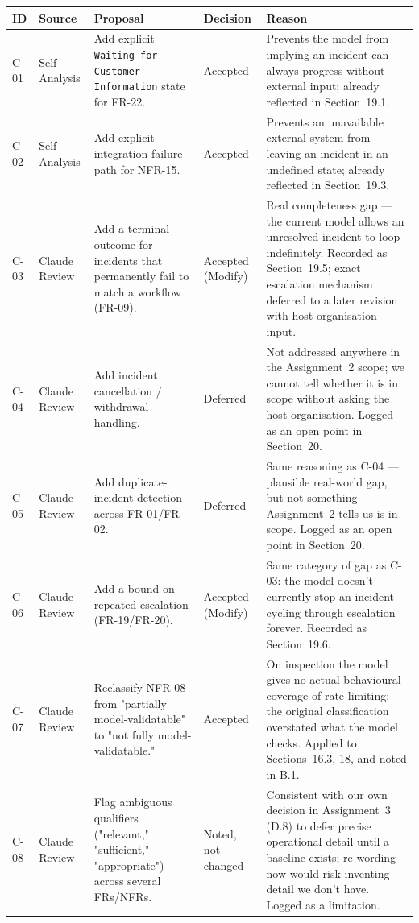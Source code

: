 \documentclass[11pt,a4paper]{article}
\begin{document}
\begin{center}
\small
\begin{tabularx}{\textwidth}{@{} l l X >{\centering\arraybackslash}p{1.9cm} X @{}}
\toprule
\textbf{ID} & \textbf{Source} & \textbf{Proposal} & \textbf{Decision} & \textbf{Reason} \\
\midrule
C-01 & Self Analysis & Add explicit \texttt{Waiting for Customer Information} state for FR-22. & Accepted & Prevents the model from implying an incident can always progress without external input; already reflected in Section~19.1. \\
C-02 & Self Analysis & Add explicit integration-failure path for NFR-15. & Accepted & Prevents an unavailable external system from leaving an incident in an undefined state; already reflected in Section~19.3. \\
C-03 & Claude Review & Add a terminal outcome for incidents that permanently fail to match a workflow (FR-09). & Accepted (Modify) & Real completeness gap — the current model allows an unresolved incident to loop indefinitely. Recorded as Section~19.5; exact escalation mechanism deferred to a later revision with host-organisation input. \\
C-04 & Claude Review & Add incident cancellation / withdrawal handling. & Deferred & Not addressed anywhere in the Assignment~2 scope; we cannot tell whether it is in scope without asking the host organisation. Logged as an open point in Section~20. \\
C-05 & Claude Review & Add duplicate-incident detection across FR-01/FR-02. & Deferred & Same reasoning as C-04 — plausible real-world gap, but not something Assignment~2 tells us is in scope. Logged as an open point in Section~20. \\
C-06 & Claude Review & Add a bound on repeated escalation (FR-19/FR-20). & Accepted (Modify) & Same category of gap as C-03: the model doesn't currently stop an incident cycling through escalation forever. Recorded as Section~19.6. \\
C-07 & Claude Review & Reclassify NFR-08 from "partially model-validatable" to "not fully model-validatable." & Accepted & On inspection the model gives no actual behavioural coverage of rate-limiting; the original classification overstated what the model checks. Applied to Sections~16.3, 18, and noted in B.1. \\
C-08 & Claude Review & Flag ambiguous qualifiers ("relevant," "sufficient," "appropriate") across several FRs/NFRs. & Noted, not changed & Consistent with our own decision in Assignment~3 (D.8) to defer precise operational detail until a baseline exists; re-wording now would risk inventing detail we don't have. Logged as a limitation. \\

\end{tabularx}
\end{center}
\end{document}
